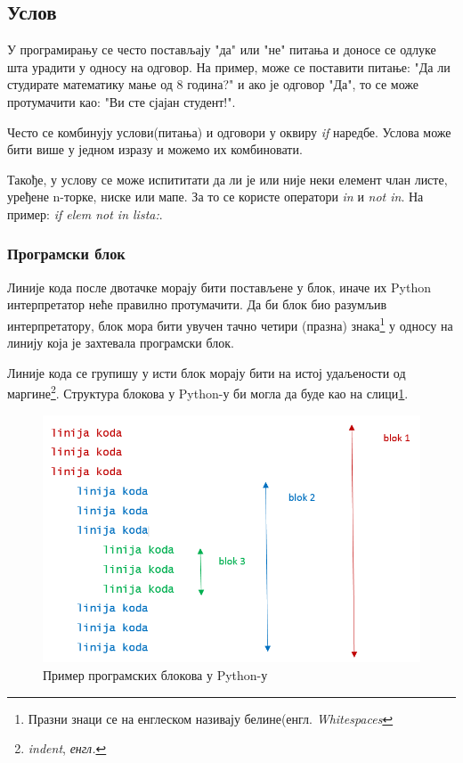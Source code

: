 \subsection{Услов}

У програмирању се често постављају "да" или "не" питања и доносе се одлуке шта урадити у односу на одговор. На пример, може се поставити питање: "Да ли студирате математику мање од 8 година?" и ако је одговор "Да", то се може протумачити као: "Ви сте сјајан студент!".

Често се комбинују услови(питања) и одговори у оквиру \emph{if} наредбе. Услова може бити више у једном изразу и можемо их комбиновати.

Такође, у услову се може испититати да ли је или није неки елемент члан листе, уређене n-торке, ниске или мапе.  За то се користе оператори \emph{in} и \emph{not in}. На пример: \emph{if elem not in lista:}.

\subsubsection{Програмски блок}

Линије кода после двотачке морају бити постављене у блок, иначе их Python интерпретатор неће правилно протумачити. Да би блок био разумљив интерпретатору, блок мора бити увучен тачно четири (празна) знака\footnote{Празни знаци се на енглеском називају белине(енгл. \emph{Whitespaces}}  у односу на линију која је захтевала програмски блок\cite{PEP}.

Линије кода се групишу у исти блок морају бити на истој удаљености од маргине\footnote{\emph{indent}, \emph{енгл.}}. Структура блокова у Python-у би могла да буде као на слици\ref{slike:whitespace}.

\begin{figure}[here]
\centering
\includegraphics[scale=0.5]{whitespace.png}
\caption{Пример програмских блокова у Python-у}
\label{slike:whitespace}
\end{figure}

